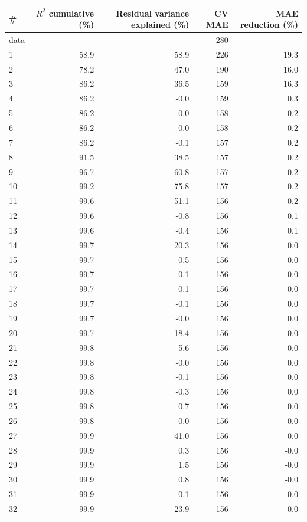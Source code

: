 \documentclass[11pt,a4paper]{article}
\begin{document}
\begin{center}
\begin{tabular}{lrrrr}
\toprule
\# & $R^2$ cumulative (\%) & Residual variance explained (\%) & CV MAE & MAE reduction (\%) \\
\midrule
data & & & 280 & \\
1 & 58.9 & 58.9 & 226 & 19.3 \\
2 & 78.2 & 47.0 & 190 & 16.0 \\
3 & 86.2 & 36.5 & 159 & 16.3 \\
4 & 86.2 & -0.0 & 159 & 0.3 \\
5 & 86.2 & -0.0 & 158 & 0.2 \\
6 & 86.2 & -0.0 & 158 & 0.2 \\
7 & 86.2 & -0.1 & 157 & 0.2 \\
8 & 91.5 & 38.5 & 157 & 0.2 \\
9 & 96.7 & 60.8 & 157 & 0.2 \\
10 & 99.2 & 75.8 & 157 & 0.2 \\
11 & 99.6 & 51.1 & 156 & 0.2 \\
12 & 99.6 & -0.8 & 156 & 0.1 \\
13 & 99.6 & -0.4 & 156 & 0.1 \\
14 & 99.7 & 20.3 & 156 & 0.0 \\
15 & 99.7 & -0.5 & 156 & 0.0 \\
16 & 99.7 & -0.1 & 156 & 0.0 \\
17 & 99.7 & -0.1 & 156 & 0.0 \\
18 & 99.7 & -0.1 & 156 & 0.0 \\
19 & 99.7 & -0.0 & 156 & 0.0 \\
20 & 99.7 & 18.4 & 156 & 0.0 \\
21 & 99.8 & 5.6 & 156 & 0.0 \\
22 & 99.8 & -0.0 & 156 & 0.0 \\
23 & 99.8 & -0.1 & 156 & 0.0 \\
24 & 99.8 & -0.3 & 156 & 0.0 \\
25 & 99.8 & 0.7 & 156 & 0.0 \\
26 & 99.8 & -0.0 & 156 & 0.0 \\
27 & 99.9 & 41.0 & 156 & 0.0 \\
28 & 99.9 & 0.3 & 156 & -0.0 \\
29 & 99.9 & 1.5 & 156 & -0.0 \\
30 & 99.9 & 0.8 & 156 & -0.0 \\
31 & 99.9 & 0.1 & 156 & -0.0 \\
32 & 99.9 & 23.9 & 156 & -0.0 \\

\end{tabular}
\end{center}
\end{document}
